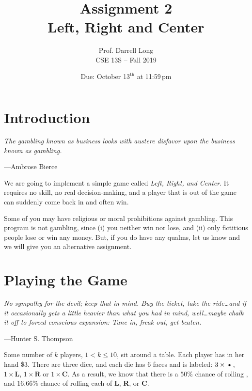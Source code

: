 \documentclass{article}
\title{Assignment 2 \\ Left, Right and Center}
\author{Prof. Darrell Long \\
CSE 13S -- Fall 2019}
\date{Due: October 13$^\text{th}$ at 11:59\,pm}
\begin{document}
\maketitle


\section{Introduction}
\textwidth
\epigraph{\emph{The gambling known as business looks with austere disfavor
upon the business known as gambling.}}{---Ambrose Bierce}

\noindent We are going to implement a simple game called \emph{Left, Right, and Center}.
It requires no skill, no real decision-making, and a player that is out of the
game can suddenly come back in and often win.

Some of you may have religious or moral prohibitions against gambling. This
program is not gambling, since (i) you neither win nor lose, and (ii) only
fictitious people lose or win any money. But, if you do have any qualms, let
us know and we will give you an alternative assignment.

\section{Playing the Game}
\textwidth
\epigraph{\emph{No sympathy for the devil; keep that in mind. Buy
the ticket, take the ride\ldots and if it occasionally gets a little
heavier than what you had in mind, well\ldots maybe chalk it off
to forced conscious expansion: Tune in, freak out, get beaten.}}{---Hunter
S. Thompson}

Some number of $k$ players, $1 < k \le 10$, sit around a table.
Each player has in her hand \$3. There are three dice, and each die
has $6$ faces and is labeled: $3 \times \textbf{\textbullet}$, $1
\times \textbf{L}$, $1 \times \textbf{R}$ or $1 \times \textbf{C}$.
As a result, we know that there is a $50$\% chance of rolling
\textbf{\textbullet}, and $16.6\overline{6}$\% chance of rolling
each of \textbf{L}, \textbf{R}, or \textbf{C}.
\end{document}
